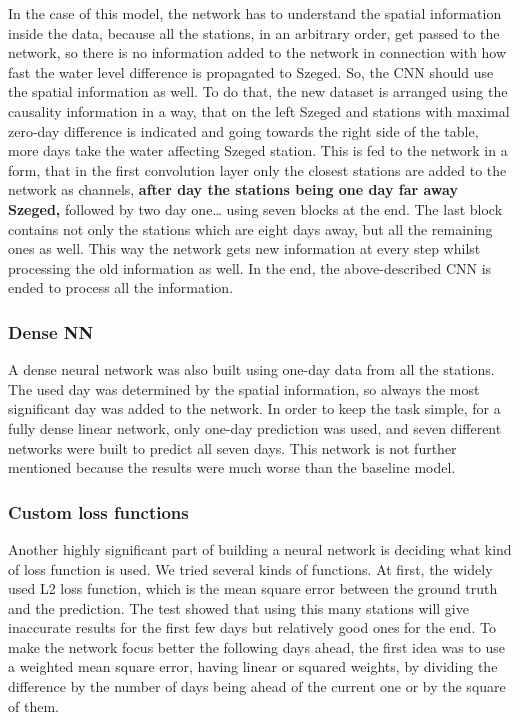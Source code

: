 \documentclass{article}
\newcommand{\tmstrong}[1]{\textbf{#1}}
\begin{document}
In the case of this model, the network has to understand the spatial
information inside the data, because all the stations, in an arbitrary order,
get passed to the network, so there is no information added to the network in
connection with how fast the water level difference is propagated to Szeged.
So, the CNN should use the spatial information as well. To do that, the new
dataset is arranged using the causality information in a way, that on the left
Szeged and stations with maximal zero-day difference is indicated and going
towards the right side of the table, more days take the water affecting Szeged
station. This is fed to the network in a form, that in the first convolution
layer only the closest stations are added to the network as channels,
{\tmstrong{after day the stations being one day far away Szeged,}} followed by
two day one{\ldots} using seven blocks at the end. The last block contains not
only the stations which are eight days away, but all the remaining ones as
well. This way the network gets new information at every step whilst
processing the old information as well. In the end, the above-described CNN is
ended to process all the information.

\subsubsection{Dense NN}

A dense neural network was also built using one-day data from all the
stations. The used day was determined by the spatial information, so always
the most significant day was added to the network. In order to keep the task
simple, for a fully dense linear network, only one-day prediction was used,
and seven different networks were built to predict all seven days. This
network is not further mentioned because the results were much worse than the
baseline model.

\subsubsection{Custom loss functions}

Another highly significant part of building a neural network is deciding what
kind of loss function is used. We tried several kinds of functions. At first,
the widely used L2 loss function, which is the mean square error between the
ground truth and the prediction. The test showed that using this many stations
will give inaccurate results for the first few days but relatively good ones
for the end. To make the network focus better the following days ahead, the
first idea was to use a weighted mean square error, having linear or squared
weights, by dividing the difference by the number of days being ahead of the
current one or by the square of them.
\end{document}
